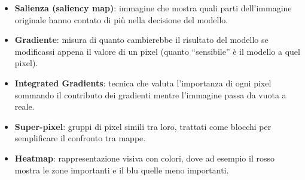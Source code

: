 \documentclass[a4paper,11pt]{article}
\begin{document}
\begin{itemize}
  \item \textbf{Salienza (saliency map)}: immagine che mostra quali parti dell’immagine originale hanno contato di più nella decisione del modello.
  \item \textbf{Gradiente}: misura di quanto cambierebbe il risultato del modello se modificassi appena il valore di un pixel (quanto “sensibile” è il modello a quel pixel).
  \item \textbf{Integrated Gradients}: tecnica che valuta l’importanza di ogni pixel sommando il contributo dei gradienti mentre l’immagine passa da vuota a reale.
  \item \textbf{Super-pixel}: gruppi di pixel simili tra loro, trattati come blocchi per semplificare il confronto tra mappe.
  \item \textbf{Heatmap}: rappresentazione visiva con colori, dove ad esempio il rosso mostra le zone importanti e il blu quelle meno importanti.
\end{itemize}
\end{document}
